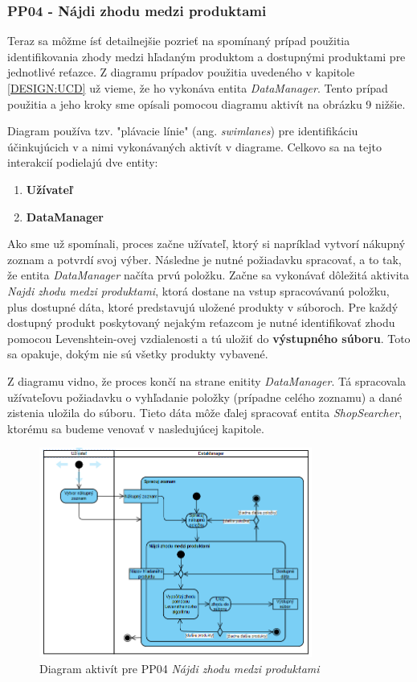 \documentclass[twoside,slovak, a4paper]{article}
\begin{document}
\subsubsection*{PP04 - Nájdi zhodu medzi produktami}

Teraz sa môžme ísť detailnejšie pozrieť na spomínaný prípad použitia identifikovania zhody medzi hľadaným produktom a dostupnými produktami pre jednotlivé reťazce. Z diagramu prípadov použitia uvedeného v kapitole \ref{DESIGN:UCD} už vieme, že ho vykonáva entita \textit{DataManager}. 
Tento prípad použitia a jeho kroky sme opísali pomocou diagramu aktivít na obrázku 9 nižšie.

Diagram používa tzv. "plávacie línie" (ang. \textit{swimlanes}) pre identifikáciu účinkujúcich v a nimi vykonávaných aktivít v diagrame. Celkovo sa na tejto interakcií podielajú dve entity:

\begin{enumerate}
    \item \textbf{Užívateľ}
    \item \textbf{DataManager}
\end{enumerate}

Ako sme už spomínali, proces začne užívateľ, ktorý si napríklad vytvorí nákupný zoznam a potvrdí svoj výber. Následne je nutné požiadavku spracovať, a to tak, že entita \textit{DataManager} načíta prvú položku. Začne sa vykonávať dôležitá aktivita \textit{Najdi zhodu medzi produktami}, ktorá dostane na vstup spracovávanú položku, plus dostupné dáta, ktoré predstavujú uložené produkty v súboroch. Pre každý dostupný produkt poskytovaný nejakým reťazcom je nutné identifikovať zhodu pomocou Levenshtein-ovej vzdialenosti a tú uložiť do \textbf{výstupného súboru}. Toto sa opakuje, dokým nie sú všetky produkty vybavené.

Z diagramu vidno, že proces končí na strane enitity \textit{DataManager}. Tá spracovala užívateľovu požiadavku o vyhľadanie položky (prípadne celého zoznamu) a dané zistenia uložila do súboru. Tieto dáta môže ďalej spracovať entita \textit{ShopSearcher}, ktorému sa budeme venovať v nasledujúcej kapitole.

\begin{figure}[tbh]
    \centering
    \includegraphics[width=0.8\textwidth]{pics/design/data_search.png}
    \caption{Diagram aktivít pre PP04 \textit{Nájdi zhodu medzi produktami}}
    \label{fig:10}
\end{figure}
\end{document}
